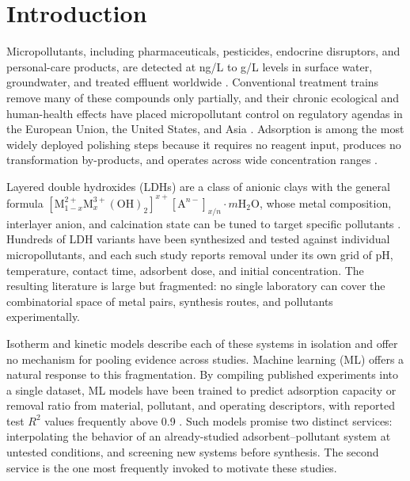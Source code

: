 \section{Introduction}
\label{sec:intro}

Micropollutants, including pharmaceuticals, pesticides, endocrine
disruptors, and personal-care products, are detected at ng/L to \textmu g/L
levels in surface water, groundwater, and treated effluent worldwide
\citep{TODO-micropollutant-occurrence}. Conventional treatment trains
remove many of these compounds only partially, and their chronic ecological
and human-health effects have placed micropollutant control on regulatory
agendas in the European Union, the United States, and Asia
\citep{TODO-regulation}. Adsorption is among the most widely deployed
polishing steps because it requires no reagent input, produces no
transformation by-products, and operates across wide concentration ranges
\citep{TODO-adsorption-review}.

Layered double hydroxides (LDHs) are a class of anionic clays with the
general formula
$[\mathrm{M}^{2+}_{1-x}\mathrm{M}^{3+}_{x}(\mathrm{OH})_2]^{x+}
[\mathrm{A}^{n-}]_{x/n}\cdot m\mathrm{H_2O}$, whose metal composition,
interlayer anion, and calcination state can be tuned to target specific
pollutants \citep{TODO-ldh-review}. Hundreds of LDH variants have been
synthesized and tested against individual micropollutants, and each such
study reports removal under its own grid of pH, temperature, contact time,
adsorbent dose, and initial concentration. The resulting literature is
large but fragmented: no single laboratory can cover the combinatorial
space of metal pairs, synthesis routes, and pollutants experimentally.

Isotherm and kinetic models describe each of these systems in isolation
and offer no mechanism for pooling evidence across studies. Machine
learning (ML) offers a natural response to this fragmentation.
By compiling published experiments into a single dataset, ML models have
been trained to predict adsorption capacity or removal ratio from
material, pollutant, and operating descriptors, with reported test
$R^2$ values frequently above 0.9
\citep{TODO-ml-adsorption-1, TODO-ml-adsorption-2, TODO-biochar-cubist}.
Such models promise two distinct services: interpolating the behavior of
an already-studied adsorbent--pollutant system at untested conditions, and
screening new systems before synthesis. The second service is the one
most frequently invoked to motivate these studies.

